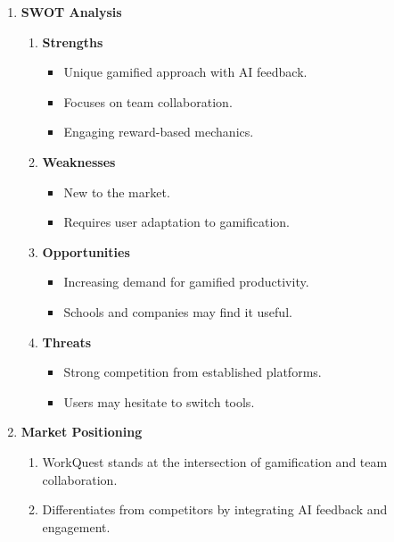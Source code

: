 \begin{enumerate}
    \item \textbf{SWOT Analysis}
    \begin{enumerate}
        \item \textbf{Strengths}
        \begin{itemize}
            \item Unique gamified approach with AI feedback.
            \item Focuses on team collaboration.
            \item Engaging reward-based mechanics.
        \end{itemize}
        
        \item \textbf{Weaknesses}
        \begin{itemize}
            \item New to the market.
            \item Requires user adaptation to gamification.
        \end{itemize}

        \item \textbf{Opportunities}
        \begin{itemize}
            \item Increasing demand for gamified productivity.
            \item Schools and companies may find it useful.
        \end{itemize}

        \item \textbf{Threats}
        \begin{itemize}
            \item Strong competition from established platforms.
            \item Users may hesitate to switch tools.
        \end{itemize}
    \end{enumerate}

    \item \textbf{Market Positioning}
    \begin{enumerate}
        \item WorkQuest stands at the intersection of gamification and team collaboration.
        \item Differentiates from competitors by integrating AI feedback and engagement.
    \end{enumerate}

\end{enumerate}

